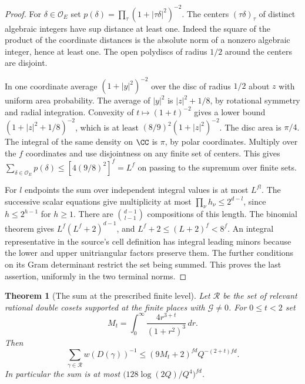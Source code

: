 \documentclass[a4paper,11pt]{article}
\newtheorem{theorem}[proposition]{Theorem}
\theoremstyle{definition}
\theoremstyle{remark}
\numberwithin{equation}{section}
\begin{document}
\begin{proof}
For \(\delta\in\mathcal O_E\) set
\(p(\delta)=\prod_\tau(1+|\tau\delta|^2)^{-2}\). The centers
\((\tau\delta)_\tau\) of distinct algebraic integers have sup
distance at least one. Indeed the square of the product of the
coordinate distances is the absolute norm of a nonzero algebraic
integer, hence at least one. The open polydiscs of radius \(1/2\)
around the centers are disjoint.

In one coordinate average \((1+|y|^2)^{-2}\) over the disc of
radius \(1/2\) about \(z\) with uniform area probability.
The average of \(|y|^2\) is \(|z|^2+1/8\), by rotational symmetry
and radial integration. Convexity of \(t\mapsto(1+t)^{-2}\) gives
a lower bound \((1+|z|^2+1/8)^{-2}\), which is at least
\((8/9)^2(1+|z|^2)^{-2}\). The disc area is \(\pi/4\). The
integral of the same density on \(\CC\) is \(\pi\), by polar
coordinates. Multiply over the \(f\) coordinates and use disjointness
on any finite set of centers. This gives
\(\sum_{\delta\in\mathcal O_E}p(\delta)\le[4(9/8)^2]^f=L^f\)
on passing to the supremum over finite sets.

For \(l\) endpoints the sum over independent integral values is at
most \(L^{fl}\). The successive scalar equations give multiplicity
at most \(\prod_\nu h_\nu\le 2^{d-l}\), since \(h\le2^{h-1}\)
for \(h\ge1\). There are \(\binom{d-1}{l-1}\) compositions of this
length. The binomial theorem gives \(L^f(L^f+2)^{d-1}\), and
\(L^f+2\le(L+2)^f<8^f\). An integral representative in the source's
cell definition has integral leading minors because the lower and
upper unitriangular factors preserve them. The further conditions
on its Gram determinant restrict the set being summed. This proves
the last assertion, uniformly in the two terminal norms.
\end{proof}

\begin{theorem}[The sum at the prescribed finite level]\label{thm:levelsum203}
Let \(\mathcal R\) be the set of relevant rational double cosets
supported at the finite places with \(\mathcal G\ne0\). For
\(0\le t<2\) set
\[
       M_t=\int_0^\infty \frac{4r^{3+t}}{(1+r^2)^3}\,dr .
\]
Then
\begin{equation}
    \sum_{\gamma\in\mathcal R} w(D(\gamma))^{-1}
      \le (9M_t+2)^{fd}Q^{-(2+t)fd}.                         \label{eq:levelsum203}
\end{equation}
In particular the sum is at most
\(\bigl(128\log(2Q)/Q^4\bigr)^{fd}\).
\end{theorem}
\end{document}
